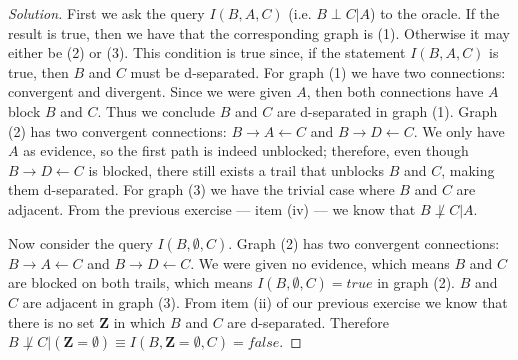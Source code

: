 \documentclass{amsart}
\theoremstyle{plain}
\begin{document}
\begin{proof}[Solution]
  First we ask the query $I(B,A,C)$ (i.e. $B\perp C|A$) to the oracle. If the result is true, then
  we have that the corresponding graph is (1). Otherwise it may either be (2) or (3). This
  condition is true since, if the statement $I(B,A,C)$ is true, then $B$ and $C$ must be
  d-separated. For graph (1) we have two connections: convergent and divergent. Since we were given
  $A$, then both connections have $A$ block $B$ and $C$. Thus we conclude $B$ and $C$ are
  d-separated in graph (1). Graph (2) has two convergent connections: $B\to A\gets C$ and $B\to D
  \gets C$. We only have $A$ as evidence, so the first path is indeed unblocked; therefore, even
  though $B\to D\gets C$ is blocked, there still exists a trail that unblocks $B$ and $C$, making
  them d-separated. For graph (3) we have the trivial case where $B$ and $C$ are adjacent. From the
  previous exercise --- item (iv) --- we know that $B\not\perp C|A$.

  Now consider the query $I(B,\emptyset,C)$. Graph (2) has two convergent connections: $B\to A\gets
  C$ and $B\to D\gets C$. We were given no evidence, which means $B$ and $C$ are blocked on both
  trails, which means $I(B,\emptyset,C)=true$ in graph (2). $B$ and $C$ are adjacent in graph (3).
  From item (ii) of our previous exercise we know that there is no set $\mathbf{Z}$ in which $B$
  and $C$ are d-separated. Therefore $B\not\perp C|(\mathbf{Z}=\emptyset)\equiv I(B,\mathbf{Z}=
  \emptyset,C)=false$.
\end{proof}

\newpage

\printbibliography[]
\end{document}
